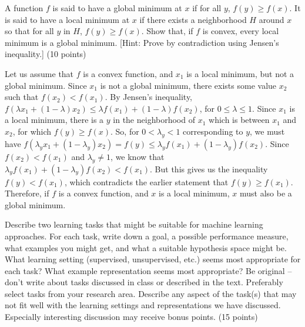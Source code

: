 \documentclass[fleqn]{homework}
\begin{document}
  \begin{problem}{2}
    \begin{question}
      A function $f$ is said to have a global minimum at $x$ if for all $y$,
      $f(y) \ge f(x)$.  It is said to have a local minimum at $x$ if there
      exists a neighborhood $H$ around $x$ so that for all $y$ in $H$,
      $f(y) \ge f(x)$.  Show that, if $f$ is convex, every local minimum is a
      global minimum.  [Hint: Prove by contradiction using Jensen's inequality.]
      (10 points)
    \end{question}

    Let us assume that $f$ is a convex function, and $x_1$ is a local minimum,
    but not a global minimum.  Since $x_1$ is not a global minimum, there exists
    some value $x_2$ such that $f(x_2) < f(x_1)$.  By Jensen's inequality,
    $f(\lambda x_1 + (1-\lambda) x_2) \le \lambda f(x_1) + (1-\lambda) f(x_2)$,
    for $0 \le \lambda \le 1$.  Since $x_1$ is a local minimum, there is a $y$
    in the neighborhood of $x_1$ which is between $x_1$ and $x_2$, for which
    $f(y) \ge f(x)$.  So, for $0 < \lambda_y < 1$ corresponding to $y$, we must
    have
    $f(\lambda_y x_1 + (1-\lambda_y) x_2) = f(y) \le \lambda_y f(x_1) +
    (1-\lambda_y) f(x_2)$.
    Since $f(x_2) < f(x_1)$ and $\lambda_y \ne 1$, we know that
    $\lambda_y f(x_1) + (1-\lambda_y) f(x_2) < f(x_1)$.  But this gives us the
    inequality $f(y) < f(x_1)$, which contradicts the earlier statement that
    $f(y) \ge f(x_1)$.  Therefore, if $f$ is a convex function, and $x$ is a
    local minimum, $x$ must also be a global minimum.
  \end{problem}

  \begin{problem}{3}
    \begin{question}
      Describe two learning tasks that might be suitable for machine learning
      approaches.  For each task, write down a goal, a possible performance
      measure, what examples you might get, and what a suitable hypothesis space
      might be.  What learning setting (supervised, unsupervised, etc.) seems
      most appropriate for each task?  What example representation seems most
      appropriate?  Be original -- don't write about tasks discussed in class or
      described in the text.  Preferably select tasks from your research area.
      Describe any aspect of the task(s) that may not fit well with the learning
      settings and representations we have discussed.  Especially interesting
      discussion may receive bonus points. (15 points)
    \end{question}
  \end{problem}
\end{document}
